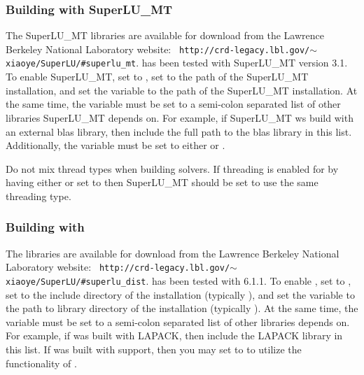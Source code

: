 \subsubsection*{Building with SuperLU\_MT}
The SuperLU\_MT libraries are available for download from the Lawrence Berkeley
National Laboratory website: {\tt
http://crd-legacy.lbl.gov/$\sim$xiaoye/SuperLU/\#superlu\_mt}.  {\sundials} has
been tested with SuperLU\_MT version 3.1.  To enable SuperLU\_MT, set
 to , set  to the
 path of the SuperLU\_MT installation, and set the variable
\newline{} to the  path of the SuperLU\_MT
installation.  At the same time, the variable  must be
set to a semi-colon separated list of other libraries SuperLU\_MT depends on.
For example, if SuperLU\_MT ws build with an external blas library, then include
the full path to the blas library in this list. Additionally, the variable
 must be set to either  or
\id{{\openmp}}.

\noindent Do not mix thread types when building {\sundials} solvers.  If
threading is enabled for {\sundials} by having either  or
 set to  then SuperLU\_MT should be set to use the
same threading type.{\warn}

\subsubsection*{Building with {\superludist}}
The {\superludist} libraries are available for download from the Lawrence
Berkeley National Laboratory website: {\tt
http://crd-legacy.lbl.gov/$\sim$xiaoye/SuperLU/\#superlu\_dist}.  {\sundials}
has been tested with {\superludist} 6.1.1.  To enable {\superludist}, set
 to , set  to the
include directory of the {\superludist} installation (typically ), and
set the variable \newline{} to the path to library
directory of the {\superludist} installation (typically ). At the same
time, the variable  must be set to a semi-colon
separated list of other libraries {\superludist} depends on. For example, if
{\superludist} was built with LAPACK, then include the LAPACK library in this
list.  If {\superludist} was built with {\openmp} support, then you may set
 to  to utilize the {\openmp} functionality of
{\superludist}.

